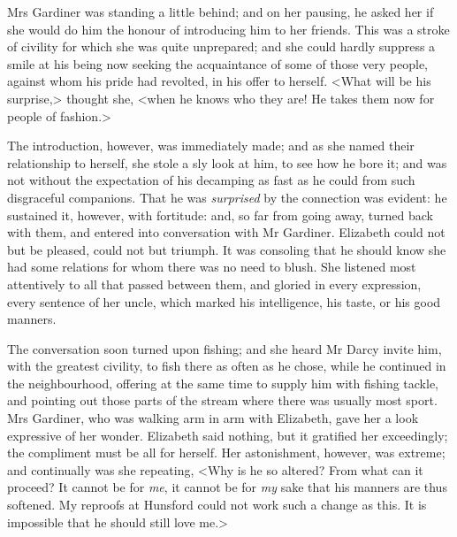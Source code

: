 Mrs Gardiner was standing a little behind; and on her pausing, he asked her if she would do him the honour of introducing him to her friends. This was a stroke of civility for which she was quite unprepared; and she could hardly suppress a smile at his being now seeking the acquaintance of some of those very people, against whom his pride had revolted, in his offer to herself. <What will be his surprise,> thought she, <when he knows who they are! He takes them now for people of fashion.>

The introduction, however, was immediately made; and as she named their relationship to herself, she stole a sly look at him, to see how he bore it; and was not without the expectation of his decamping as fast as he could from such disgraceful companions. That he was \textit{surprised} by the connection was evident: he sustained it, however, with fortitude: and, so far from going away, turned back with them, and entered into conversation with Mr Gardiner. Elizabeth could not but be pleased, could not but triumph. It was consoling that he should know she had some relations for whom there was no need to blush. She listened most attentively to all that passed between them, and gloried in every expression, every sentence of her uncle, which marked his intelligence, his taste, or his good manners.

The conversation soon turned upon fishing; and she heard Mr Darcy invite him, with the greatest civility, to fish there as often as he chose, while he continued in the neighbourhood, offering at the same time to supply him with fishing tackle, and pointing out those parts of the stream where there was usually most sport. Mrs Gardiner, who was walking arm in arm with Elizabeth, gave her a look expressive of her wonder. Elizabeth said nothing, but it gratified her exceedingly; the compliment must be all for herself. Her astonishment, however, was extreme; and continually was she repeating, <Why is he so altered? From what can it proceed? It cannot be for \textit{me}, it cannot be for \textit{my} sake that his manners are thus softened. My reproofs at Hunsford could not work such a change as this. It is impossible that he should still love me.>

